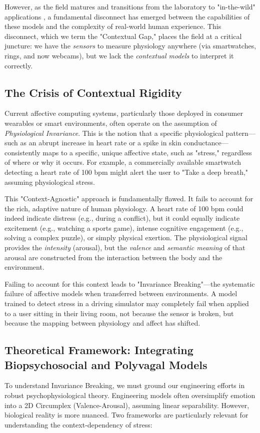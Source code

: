 \documentclass[journal]{IEEEtran}
\begin{document}
However, as the field matures and transitions from the laboratory to "in-the-wild" applications \cite{ambulatory_assessment}, a fundamental disconnect has emerged between the capabilities of these models and the complexity of real-world human experience. This disconnect, which we term the "Contextual Gap," places the field at a critical juncture: we have the \textit{sensors} to measure physiology anywhere (via smartwatches, rings, and now webcams), but we lack the \textit{contextual models} to interpret it correctly.

\subsection{The Crisis of Contextual Rigidity}
Current affective computing systems, particularly those deployed in consumer wearables or smart environments, often operate on the assumption of \textit{Physiological Invariance}. This is the notion that a specific physiological pattern—such as an abrupt increase in heart rate or a spike in skin conductance—consistently maps to a specific, unique affective state, such as "stress," regardless of where or why it occurs. For example, a commercially available smartwatch detecting a heart rate of 100 bpm might alert the user to "Take a deep breath," assuming physiological stress.

This "Context-Agnostic" approach is fundamentally flawed. It fails to account for the rich, adaptive nature of human physiology. A heart rate of 100 bpm could indeed indicate distress (e.g., during a conflict), but it could equally indicate excitement (e.g., watching a sports game), intense cognitive engagement (e.g., solving a complex puzzle), or simply physical exertion. The physiological signal provides the \textit{intensity} (arousal), but the \textit{valence} and \textit{semantic meaning} of that arousal are constructed from the interaction between the body and the environment.

Failing to account for this context leads to "Invariance Breaking"—the systematic failure of affective models when transferred between environments. A model trained to detect stress in a driving simulator may completely fail when applied to a user sitting in their living room, not because the sensor is broken, but because the mapping between physiology and affect has shifted.

\subsection{Theoretical Framework: Integrating Biopsychosocial and Polyvagal Models}
To understand Invariance Breaking, we must ground our engineering efforts in robust psychophysiological theory. Engineering models often oversimplify emotion into a 2D Circumplex (Valence-Arousal), assuming linear separability. However, biological reality is more nuanced. Two frameworks are particularly relevant for understanding the context-dependency of stress:
\end{document}
